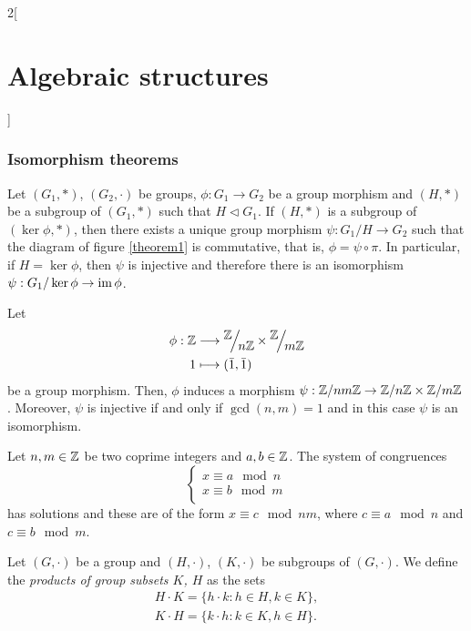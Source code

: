 \documentclass[../../../main.tex]{subfiles}
\begin{document}
\begin{multicols}{2}[\section{Algebraic structures}]
\subsubsection{Isomorphism theorems}
\begin{theorem}
    Let $(G_1,*)$, $(G_2,\cdot)$ be groups, $\phi:G_1\rightarrow G_2$ be a group morphism and $(H,*)$ be a subgroup of $(G_1,*)$ such that $H\lhd G_1$. If $(H,*)$ is a subgroup of $(\ker\phi,*)$, then there exists a unique group morphism $\psi:G_1/H\rightarrow G_2$ such that the diagram of figure \ref{theorem1} is commutative, that is, $\phi=\psi\circ\pi$.
    In particular, if $H=\ker\phi$, then $\psi$ is injective and therefore there is an isomorphism $\psi:G_1/\ker\phi\rightarrow\operatorname{im}\phi$.
\end{theorem}
\begin{theorem}
    Let 
    \begin{align*}
        \phi:\ZZ &\longrightarrow\quot{\ZZ }{n\ZZ }\times\quot{\ZZ }{m\ZZ }\\
        1&\longmapsto(\Bar{1},\Bar{1})
    \end{align*}
    be a group morphism. Then, $\phi$ induces a morphism $\psi:\mathbb{Z} /nm\mathbb{Z} \rightarrow\mathbb{Z} /n\mathbb{Z} \times\mathbb{Z} /m\mathbb{Z} $. Moreover, $\psi$ is injective if and only if $\gcd(n,m)=1$ and in this case $\psi$ is an isomorphism. 
\end{theorem}
\begin{corollary}
    Let $n,m\in\mathbb{Z} $ be two coprime integers and $a,b\in\mathbb{Z} $. The system of congruences $$\left\{\begin{array}{l}
        x\equiv a\mod{n}  \\
        x\equiv b\mod{m}  \\
    \end{array}\right.$$ has solutions and these are of the form $x\equiv c\mod{nm}$, where $c\equiv a\mod{n}$ and $c\equiv b\mod{m}$.
\end{corollary}
\begin{definition}
    Let $(G,\cdot)$ be a group and $(H,\cdot)$, $(K,\cdot)$ be subgroups of $(G,\cdot)$. We define the \textit{products of group subsets $K$, $H$} as the sets 
    \begin{gather*}
        H\cdot K=\{h\cdot k:h\in H,k\in K\},\\
        K\cdot H=\{k\cdot h:k\in K,h\in H\}.
    \end{gather*}
\end{definition}

\end{multicols}
\end{document}
